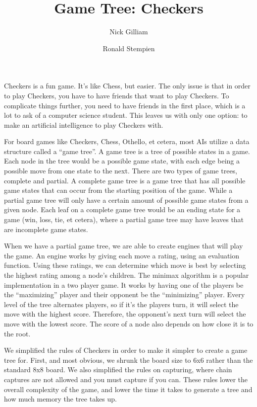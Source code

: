 \documentclass[12pt]{article}
\title{Game Tree: Checkers}
\author{Nick Gilliam \and Ronald Stempien}
\begin{document}
  \maketitle
Checkers is a fun game. It’s like Chess, but easier. The only issue is that in order to play Checkers, you have to have friends that want to play Checkers. To complicate things further, you need to have friends in the first place, which is a lot to ask of a computer science student. This leaves us with only one option: to make an artificial intelligence to play Checkers with.\par
For board games like Checkers, Chess, Othello, et cetera, most AIs utilize a data structure called a “game tree”. A game tree is a tree of possible states in a game. Each node in the tree would be a possible game state, with each edge being a possible move from one state to the next. There are two types of game trees, complete and partial. A complete game tree is a game tree that has all possible game states that can occur from the starting position of the game. While a partial game tree will only have a certain amount of possible game states from a given node. Each leaf on a complete game tree would be an ending state for a game (win, loss, tie, et cetera), where a partial game tree may have leaves that are incomplete game states.\par
When we have a partial game tree, we are able to create engines that will play the game. An engine works by giving each move a rating, using an evaluation function. Using these ratings, we can determine which move is best by selecting the highest rating among a node’s children. The minimax algorithm is a popular implementation in a two player game. It works by having one of the players be the “maximizing” player and their opponent be the “minimizing” player. Every level of the tree alternates players, so if it’s the players turn, it will select the move with the highest score. Therefore, the opponent’s next turn will select the move with the lowest score. The score of a node also depends on how close it is to the root.\par
We simplified the rules of Checkers in order to make it simpler to create a game tree for. First, and most obvious, we shrunk the board size to 6x6 rather than the standard 8x8 board. We also simplified the rules on capturing, where chain captures are not allowed and you must capture if you can. These rules lower the overall complexity of the game, and lower the time it takes to generate a tree and how much memory the tree takes up.\par
\end{document}
